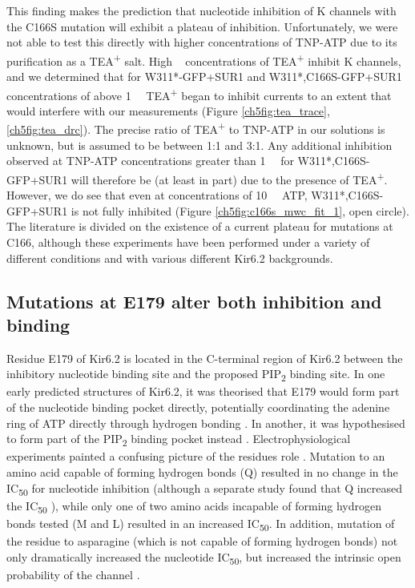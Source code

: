 This finding makes the prediction that nucleotide inhibition of K\ATP{} channels with the C166S mutation will exhibit a plateau of inhibition.
Unfortunately, we were not able to test this directly with higher concentrations of TNP-ATP due to its purification as a TEA\textsuperscript{+} salt.
High \si{\milli\Molar} concentrations of TEA\textsuperscript{+} inhibit K\ATP{} channels, and we determined that for W311*-GFP+SUR1 and W311*,C166S-GFP+SUR1 concentrations of above \SI{1}{\milli\Molar} TEA\textsuperscript{+} began to inhibit currents to an extent that would interfere with our measurements (Figure \ref{ch5fig:tea_trace}, \ref{ch5fig:tea_drc}).
The precise ratio of TEA\textsuperscript{+} to TNP-ATP in our solutions is unknown, but is assumed to be between 1:1 and 3:1.
Any additional inhibition observed at TNP-ATP concentrations greater than \SI{1}{\milli\Molar} for W311*,C166S-GFP+SUR1 will therefore be (at least in part) due to the presence of TEA\textsuperscript{+}.
However, we do see that even at concentrations of \SI{10}{\milli\Molar} ATP, W311*,C166S-GFP+SUR1 is not fully inhibited (Figure \ref{ch5fig:c166s_mwc_fit_1}, open circle).
The literature is divided on the existence of a current plateau for mutations at C166, although these experiments have been performed under a variety of different conditions and with various different Kir6.2 backgrounds.

\subsection{Mutations at E179 alter both inhibition and binding}

Residue E179 of Kir6.2 is located in the C-terminal region of Kir6.2 between the inhibitory nucleotide binding site and the proposed PIP\textsubscript{2} binding site.
In one early predicted structures of Kir6.2, it was theorised that E179 would form part of the nucleotide binding pocket directly, potentially coordinating the adenine ring of ATP directly through hydrogen bonding \cite{antcliff_functional_2005}.
In another, it was hypothesised to form part of the PIP\textsubscript{2} binding pocket instead \cite{haider_identification_2007}.
Electrophysiological experiments painted a confusing picture of the residues role \cite{antcliff_functional_2005}.
Mutation to an amino acid capable of forming hydrogen bonds (Q) resulted in no change in the IC\textsubscript{50} for nucleotide inhibition (although a separate study found that Q increased the IC\textsubscript{50} \cite{proks_involvement_1999}), while only one of two amino acids incapable of forming hydrogen bonds tested (M and L) resulted in an increased IC\textsubscript{50}.
In addition, mutation of the residue to asparagine (which is not capable of forming hydrogen bonds) not only dramatically increased the nucleotide IC\textsubscript{50}, but increased the intrinsic open probability of the channel \cite{antcliff_functional_2005}.

